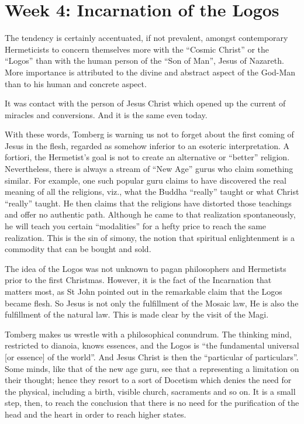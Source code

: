 \section{Week 4: Incarnation of the Logos}

\begin{quotationx}
The tendency is certainly accentuated, if not prevalent, amongst contemporary Hermeticists to concern themselves more
with the “Cosmic Christ” or the “Logos” than with the human person of the “Son of Man”, Jesus of Nazareth. More
importance is attributed to the divine and abstract aspect of the God-Man than to his human and concrete aspect.

It was contact with the person of Jesus Christ which opened up the current of miracles and conversions. And it is the
same even today. 

\end{quotationx}

With these words, Tomberg is warning us not to forget about the first coming of Jesus in the flesh, regarded as somehow
inferior to an esoteric interpretation. A fortiori, the Hermetist's goal is not to create an alternative or
“better” religion. Nevertheless, there is always a stream of “New Age” gurus who claim something similar. For example,
one such popular guru claims to have discovered the real meaning of all the religions, viz., what the Buddha “really”
taught or what Christ “really” taught. He then claims that the religions have distorted those teachings and offer no
authentic path. Although he came to that realization spontaneously, he will teach you certain “modalities” for a hefty
price to reach the same realization. This is the sin of simony, the notion that spiritual enlightenment is a commodity
that can be bought and sold.

The idea of the Logos was not unknown to pagan philosophers and Hermetists prior to the first Christmas. However, it is
the fact of the Incarnation that matters most, as St John pointed out in the remarkable claim that the Logos became
flesh. So Jesus is not only the fulfillment of the Mosaic law, He is also the fulfillment of the natural law. This is
made clear by the visit of the Magi.

Tomberg makes us wrestle with a philosophical conundrum. The thinking mind, restricted to dianoia, knows essences, and
the Logos is “the fundamental universal [or essence] of the world”. And Jesus Christ is then the “particular of
particulars”. Some minds, like that of the new age guru, see that a representing a limitation on their thought; hence
they resort to a sort of Docetism which denies the need for the physical, including a birth, visible church, sacraments
and so on. It is a small step, then, to reach the conclusion that there is no need for the purification of the head and
the heart in order to reach higher states.

